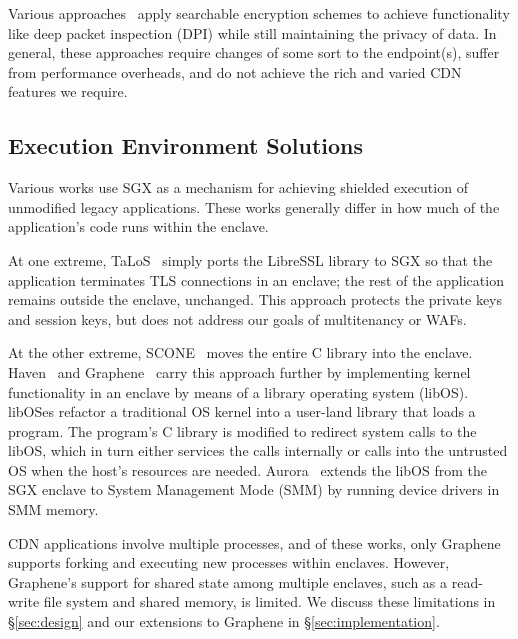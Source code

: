 Various approaches~\cite{desmoulins2018pattern,
sherry2015blindbox, canard2017blindids,lan2016embark} apply searchable
encryption schemes to achieve functionality like deep packet inspection (DPI)
while still maintaining the privacy of data.
%
In general, these approaches require changes of some sort to the endpoint(s),
suffer from performance overheads, and do not achieve the rich and varied CDN
features we require.


\subsection{Execution Environment Solutions}

%
Various works use SGX as a mechanism for achieving shielded execution of
unmodified legacy applications.
%
These works generally differ in how much of the application's code runs
within the enclave.


At one extreme, TaLoS~\cite{talos} simply ports the LibreSSL library to SGX so
that the application terminates TLS connections in an enclave; the rest of
the application remains outside the enclave, unchanged.
%
This approach protects the private keys and session
keys, but does not address our goals of multitenancy or WAFs.


At the other extreme, SCONE~\cite{scone} moves the entire C library into the enclave.
%
Haven~\cite{haven} and Graphene~\cite{graphene} carry this approach further by
implementing kernel functionality in an enclave by means of a library operating
system (libOS).
libOSes refactor a traditional OS kernel into a user-land library that loads a
program.
%
The program's C library is modified to redirect system calls to the libOS, which
in turn either services the calls internally or calls into the untrusted OS
when the host's resources are needed.
%
Aurora~\cite{liang2018aurora} extends the libOS from the SGX enclave to System
Management Mode (SMM) by running device drivers in SMM memory.


CDN applications involve multiple processes, and of these works, only Graphene
supports forking and executing new processes within enclaves.
%
However, Graphene's support for shared state among multiple enclaves, such as a
read-write file system and shared memory, is limited.
%
We discuss these limitations in \S\ref{sec:design} and our extensions to
Graphene in \S\ref{sec:implementation}.


